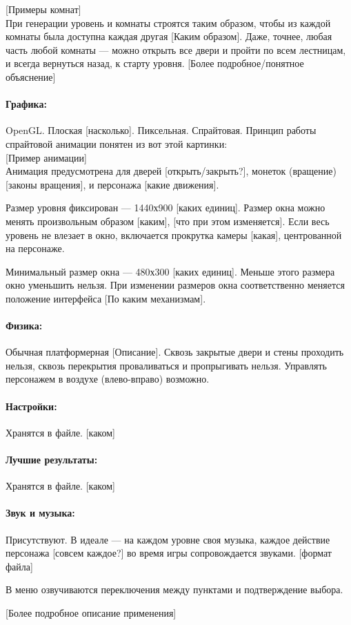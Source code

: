 \documentclass[12pt,a4paper]{article}
\begin{document}
{\color{blue}[Примеры комнат]}\\

При генерации уровень и комнаты строятся таким образом, чтобы из каждой комнаты была доступна каждая другая {\color{red} [Каким образом]}. Даже, точнее, любая часть любой комнаты --- можно открыть все двери и пройти по всем лестницам, и всегда вернуться назад, к старту уровня. {\color{red} [Более подробное/понятное объяснение]}

\paragraph{Графика:}
OpenGL. Плоская {\color{red} [насколько]}. Пиксельная. Спрайтовая. Принцип работы спрайтовой анимации понятен из вот этой картинки:\\

{\color{blue}[Пример анимации]}\\

Анимация предусмотрена для дверей {\color{red} [открыть/закрыть?]}, монеток (вращение) {\color{red} [законы вращения]}, и персонажа {\color{red} [какие движения]}.

Размер уровня фиксирован --- 1440х900 {\color{red} [каких единиц]}. Размер окна можно менять произвольным образом {\color{red} [каким], [что при этом изменяется]}. Если весь уровень не влезает в окно, включается прокрутка камеры {\color{red} [какая]}, центрованной на персонаже.

Минимальный размер окна --- 480х300 {\color{red} [каких единиц]}. Меньше этого размера окно уменьшить нельзя. При изменении размеров окна соответственно меняется положение интерфейса{\color{red} [По каким механизмам]}.

\paragraph{Физика:}
Обычная платформерная {\color{red} [Описание]}. Сквозь закрытые двери и стены {\color{red} про}ходить нельзя, сквозь перекрытия проваливаться и пропрыгивать нельзя. Управлять персонажем в воздухе (влево-вправо) возможно.

\paragraph{Настройки:}
Хранятся в файле. {\color{red} [каком]}

\paragraph{Лучшие результаты:}
Хранятся в файле. {\color{red} [каком]}

\paragraph{Звук и музыка:}
Присутствуют. В идеале --- на каждом уровне своя музыка, каждое действие персонажа {\color{red} [совсем каждое?]} во время игры сопровождается звуками.{\color{red} [формат файла]}

В меню озвучиваются переключения между пунктами и подтверждение выбора.

{\color{red} [Более подробное описание применения]}
\end{document}
